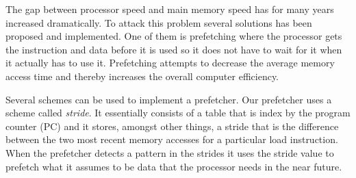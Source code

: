 The gap between processor speed and main memory speed has for many years increased dramatically. To
attack this problem several solutions has been proposed and implemented. One of them is prefetching
where the processor gets the instruction and data before it is used so it does not have to wait for
it when it actually has to use it. Prefetching attempts to decrease the average memory access time
and thereby increases the overall computer efficiency.

Several schemes can be used to implement a prefetcher. Our prefetcher uses a scheme called
\emph{stride}. It essentially consists of a table that is index by the program counter (PC) and it
stores, amongst other things, a stride that is the difference between the two most recent memory
accesses for a particular load instruction. When the prefetcher detects a pattern in the
strides it uses the stride value to prefetch what it assumes to be data that the processor needs in
the near future.
